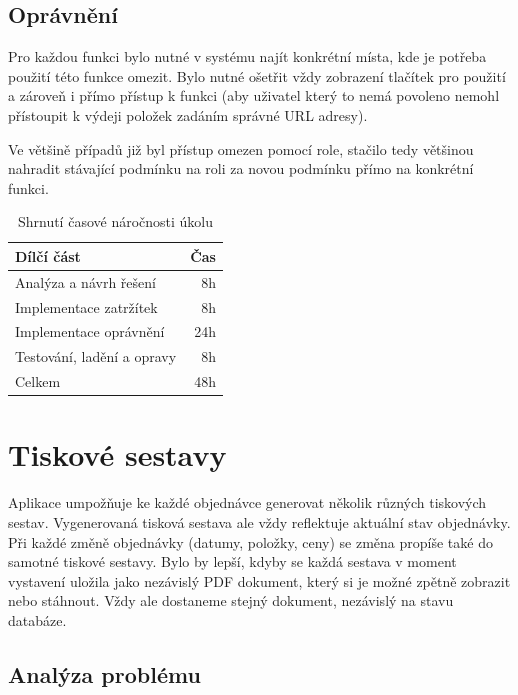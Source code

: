 \subsection{Oprávnění}

Pro každou funkci bylo nutné v systému najít konkrétní místa, kde je potřeba použití této funkce omezit. Bylo nutné ošetřit vždy zobrazení tlačítek pro použití a zároveň i přímo přístup k funkci (aby uživatel který to nemá povoleno nemohl přístoupit k výdeji položek zadáním správné URL adresy).

Ve většině případů již byl přístup omezen pomocí role, stačilo tedy většinou nahradit stávající podmínku na roli za novou podmínku přímo na konkrétní funkci.

\begin{table}
	\centering
	\caption[Časová náročnost úkolu na oprávnění]{Shrnutí časové náročnosti úkolu}
	\label{tab:TopLevelTableLabel}
	{
		\begin{tabular}{lr}
			\toprule
			Dílčí část & Čas\\
			\midrule
			Analýza a návrh řešení & 8h \\
			Implementace zatržítek & 8h \\
            Implementace oprávnění & 24h \\
            Testování, ladění a opravy & 8h \\
            \midrule
            Celkem  & 48h \\
			\midrule
		\end{tabular}
	}
\end{table}

\section{Tiskové sestavy}

Aplikace umpožňuje ke každé objednávce generovat několik různých tiskových sestav. Vygenerovaná tisková sestava ale vždy reflektuje aktuální stav objednávky. Při každé změně objednávky (datumy, položky, ceny) se změna propíše také do samotné tiskové sestavy. Bylo by lepší, kdyby se každá sestava v moment vystavení uložila jako nezávislý PDF dokument, který si je možné zpětně zobrazit nebo stáhnout. Vždy ale dostaneme stejný dokument, nezávislý na stavu databáze.

\subsection{Analýza problému}

